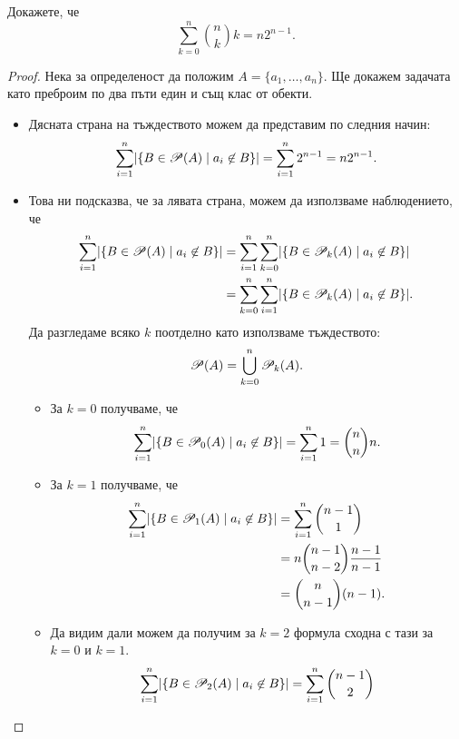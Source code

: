 \begin{problem}
  Докажете, че
  \[\sum^n_{k=0}\binom{n}{k}k = n2^{n-1}.\]
\end{problem}
\begin{proof}
  Нека за определеност да положим $A = \{a_1,\dots,a_n\}$.
  Ще докажем задачата като преброим по два пъти един и същ клас от обекти.%
  \begin{itemize}
  \item 
    Дясната страна на тъждеството можем да представим по следния начин:
    \[\sum^n_{i=1}\lvert{\{B \in \mathscr{P}(A) \mid a_i \not\in B\}}\rvert = \sum^{n}_{i=1}2^{n-1} = n2^{n-1}.\]
  \item
    Това ни подсказва, че за лявата страна, можем да използваме наблюдението, че
    \begin{align*}
      \sum^n_{i=1}\lvert{\{B \in \mathscr{P}(A) \mid a_i \not\in B\}}\rvert & = \sum^n_{i=1}\sum^n_{k=0}\lvert{\{B \in \mathscr{P}_k(A) \mid a_i \not\in B\}}\rvert\\
      & = \sum^n_{k=0}\sum^n_{i=1}\lvert{\{B \in \mathscr{P}_k(A) \mid a_i \not\in B\}}\rvert.
    \end{align*}
    Да разгледаме всяко $k$ поотделно като използваме тъждеството:
    \[\mathscr{P}(A) = \bigcup^n_{k=0}\mathscr{P}_k(A).\]
    \begin{itemize}
    \item 
      За $k = 0$ получваме, че  
      \[\sum^n_{i=1}\lvert{\{B \in \mathscr{P}_0(A) \mid a_i \not\in B\}}\rvert = \sum^n_{i=1}1 = \binom{n}{n}n.\]
    \item 
      За $k = 1$ получваме, че
      \begin{align*}
        \sum^n_{i=1}\lvert{\{B \in \mathscr{P}_1(A) \mid a_i \not\in B\}}\rvert & = \sum^n_{i=1}\binom{n-1}{1}\\
        & = n\binom{n-1}{n-2}\frac{n-1}{n-1}\\
        & = \binom{n}{n-1}(n-1).
      \end{align*}
    \item
      Да видим дали можем да получим за $k = 2$ формула сходна с тази за $k = 0$ и $k =1$.
      \begin{align*}
        \sum^n_{i=1}\abs{\{B \in \Ps_2(A) \mid a_i \not\in B\}} & = \sum^n_{i=1}\binom{n-1}{2}\\

\end{align*}
\end{itemize}
\end{itemize}
\end{proof}
